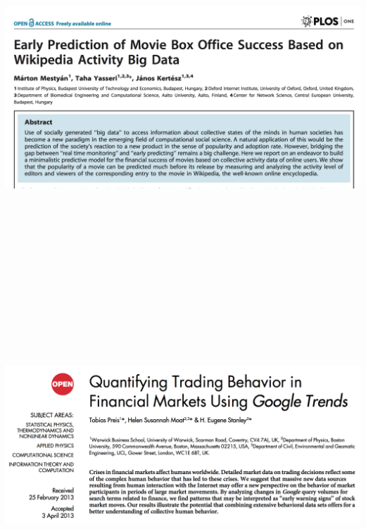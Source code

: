 \includegraphics[width=9.89583in,height=5.72917in]{movie.png}

\includegraphics[width=9.89583in,height=4.16667in]{google.png}

